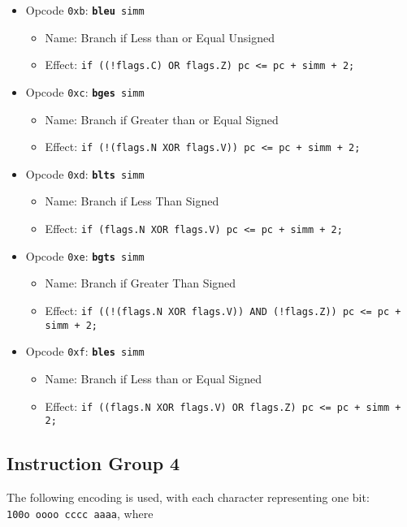 \documentclass{article}
\begin{document}
\begin{itemize}
		\item Opcode \texttt{0xb}:
			\texttt{\textbf{bleu} simm}
		\begin{itemize}
			\item Name: Branch if Less than or Equal Unsigned
			\item Effect:
				\texttt{if ((!flags.C) OR flags.Z) pc <= pc + simm + 2;}
		\end{itemize}

		\item Opcode \texttt{0xc}:
			\texttt{\textbf{bges} simm}
		\begin{itemize}
			\item Name: Branch if Greater than or Equal Signed
			\item Effect:
				\texttt{if (!(flags.N XOR flags.V)) pc <= pc + simm + 2;}
		\end{itemize}

		\item Opcode \texttt{0xd}:
			\texttt{\textbf{blts} simm}
		\begin{itemize}
			\item Name: Branch if Less Than Signed
			\item Effect:
				\texttt{if (flags.N XOR flags.V) pc <= pc + simm + 2;}
		\end{itemize}

		\item Opcode \texttt{0xe}:
			\texttt{\textbf{bgts} simm}
		\begin{itemize}
			\item Name: Branch if Greater Than Signed
			\item Effect:
				\texttt{if ((!(flags.N XOR flags.V)) AND (!flags.Z))
					pc <= pc + simm + 2;}
		\end{itemize}

		\item Opcode \texttt{0xf}:
			\texttt{\textbf{bles} simm}
		\begin{itemize}
			\item Name: Branch if Less than or Equal Signed
			\item Effect:
				\texttt{if ((flags.N XOR flags.V) OR flags.Z)
					pc <= pc + simm + 2;}
		\end{itemize}
	\end{itemize}

	\doublespacing
	\subsection{Instruction Group 4}
	The following encoding is used, with each character representing one
	bit: \\
	\texttt{100o oooo cccc aaaa}, where
\end{document}
